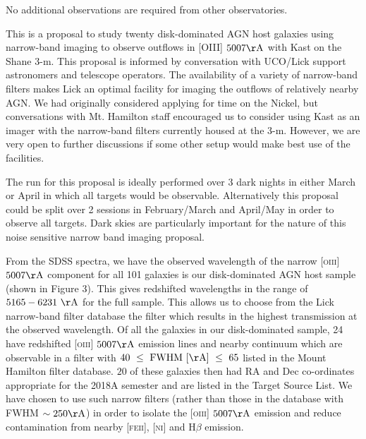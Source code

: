 \documentclass[12pt]{article}
\begin{document}
\vspace{0.25em}
\newpage


\vspace{0.25em}

\noindent No additional observations are required from other observatories.

\vspace{0.25em}


\vspace{0.25em}
This is a proposal to study twenty disk-dominated AGN host galaxies using narrow-band imaging to observe outflows in \textsc{[OIII]} $5007\rm{\AA}$ with Kast on the Shane 3-m. This proposal is informed by conversation with UCO/Lick support astronomers and telescope operators. The availability of a variety of narrow-band filters makes Lick an optimal facility for imaging the outflows of relatively nearby AGN. We had originally considered applying for time on the Nickel, but conversations with Mt. Hamilton staff encouraged us to consider using Kast as an imager with the narrow-band filters currently housed at the 3-m. However, we are very open to further discussions if some other setup would make best use of the facilities.
\vspace{0.25em}

The run for this proposal is ideally performed over 3 dark nights in either March or April in which all targets would be observable. Alternatively this proposal could be split over 2 sessions in February/March and April/May in order to observe all targets. Dark skies are particularly important for the nature of this noise sensitive narrow band imaging proposal. 

\vspace{0.25em}

From the SDSS spectra, we have the observed  wavelength of the narrow \textsc{[oiii]} $5007\rm{\AA}$ component for all 101 galaxies is our disk-dominated AGN host sample (shown in Figure 3). This gives redshifted wavelengths in the range of $5165-6231~\rm{\AA}$ for the full sample. This allows us to choose from the Lick narrow-band filter database the filter which results in the highest transmission at the observed wavelength. Of all the galaxies in our disk-dominated sample, 24 have redshifted \textsc{[oiii]} $5007\rm{\AA}$ emission lines and nearby continuum which are observable in a filter with $40~\leq~\rm{FWHM}~[\rm{\AA}]~\leq~65$ listed in the Mount Hamilton filter database. $20$ of these galaxies then had RA and Dec co-ordinates appropriate for the 2018A semester and are listed in the Target Source List. We have chosen to use such narrow filters (rather than those in the database with FWHM $\sim250\rm{\AA}$) in order to isolate the \textsc{[oiii]} $5007\rm{\AA}$ emission and reduce contamination from nearby \textsc{[feii]}, \textsc{[ni]} and H$\beta$ emission. 
\vspace{0.25em}
\end{document}
